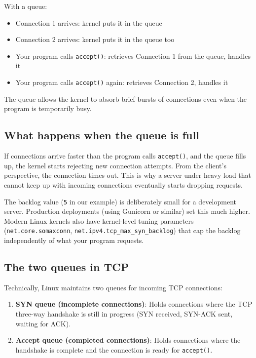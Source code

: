 \noindent{}With a queue:

\begin{itemize}
\tightlist
\item
  Connection 1 arrives: kernel puts it in the queue
\item
  Connection 2 arrives: kernel puts it in the queue too
\item
  Your program calls \texttt{accept()}: retrieves Connection 1 from the queue, handles it
\item
  Your program calls \texttt{accept()} again: retrieves Connection 2, handles it
\end{itemize}

\noindent{}The queue allows the kernel to absorb brief bursts of connections even when the program is temporarily busy.

\subsection*{What happens when the queue is full}\label{03-network-capability:what-happens-when-the-queue-is-full}

If connections arrive faster than the program calls \texttt{accept()}, and the queue fills up, the kernel starts rejecting new connection attempts. From the client's perspective, the connection times out. This is why a server under heavy load that cannot keep up with incoming connections eventually starts dropping requests.

The backlog value (\texttt{5} in our example) is deliberately small for a development server. Production deployments (using Gunicorn or similar) set this much higher. Modern Linux kernels also have kernel-level tuning parameters (\texttt{net.core.somaxconn}, \texttt{net.}\allowbreak{}\texttt{ipv4.}\allowbreak{}\texttt{tcp\_}\allowbreak{}\texttt{max\_}\allowbreak{}\texttt{syn\_}\allowbreak{}\texttt{backlog}) that cap the backlog independently of what your program requests.

\subsection*{The two queues in TCP}\label{03-network-capability:the-two-queues-in-tcp}

Technically, Linux maintains two queues for incoming TCP connections:

\begin{enumerate}
\def\labelenumi{\arabic{enumi}.}
\tightlist
\item
  \textbf{SYN queue (incomplete connections)}: Holds connections where the TCP three-way handshake is still in progress (SYN received, SYN-ACK sent, waiting for ACK).
\item
  \textbf{Accept queue (completed connections)}: Holds connections where the handshake is complete and the connection is ready for \texttt{accept()}.
\end{enumerate}

